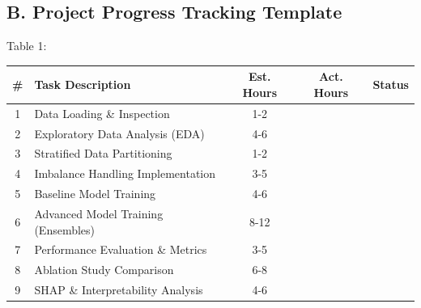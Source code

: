 \documentclass{article}
\begin{document}
\newpage
\subsection*{B. Project Progress Tracking Template}
Table 1:
\begin{table}[h]
\centering
\small
\begin{tabular}{|c|l|c|c|c|}
\hline
\textbf{\#} & \textbf{Task Description} & \textbf{Est. Hours} & \textbf{Act. Hours} & \textbf{Status} \\ \hline
1 & Data Loading \& Inspection & 1-2 & & \\ \hline
2 & Exploratory Data Analysis (EDA) & 4-6 & & \\ \hline
3 & Stratified Data Partitioning & 1-2 & & \\ \hline
4 & Imbalance Handling Implementation & 3-5 & & \\ \hline
5 & Baseline Model Training & 4-6 & & \\ \hline
6 & Advanced Model Training (Ensembles) & 8-12 & & \\ \hline
7 & Performance Evaluation \& Metrics & 3-5 & & \\ \hline
8 & Ablation Study Comparison & 6-8 & & \\ \hline
9 & SHAP \& Interpretability Analysis & 4-6 & & \\ \hline
\end{tabular}
\end{table}
\end{document}
